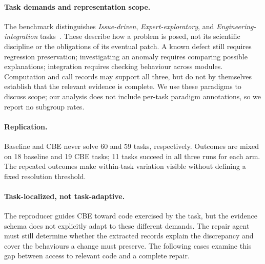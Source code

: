 \documentclass[11pt,a4paper,twocolumn]{article}
\begin{document}
\paragraph{Task demands and representation scope.}
The benchmark distinguishes \emph{Issue-driven}, \emph{Expert-exploratory}, and \emph{Engineering-integration} tasks~\citep{xu2026science}. These describe how a problem is posed, not its scientific discipline or the obligations of its eventual patch. A known defect still requires regression preservation; investigating an anomaly requires comparing possible explanations; integration requires checking behaviour across modules. Computation and call records may support all three, but do not by themselves establish that the relevant evidence is complete. We use these paradigms to discuss scope; our analysis does not include per-task paradigm annotations, so we report no subgroup rates.

\paragraph{Replication.}
Baseline and CBE never solve 60 and 59 tasks, respectively. Outcomes are mixed on 18 baseline and 19 CBE tasks; 11 tasks succeed in all three runs for each arm. The repeated outcomes make within-task variation visible without defining a fixed resolution threshold.

\paragraph{Task-localized, not task-adaptive.}
The reproducer guides CBE toward code exercised by the task, but the evidence schema does not explicitly adapt to these different demands. The repair agent must still determine whether the extracted records explain the discrepancy and cover the behaviours a change must preserve. The following cases examine this gap between access to relevant code and a complete repair.
\end{document}
